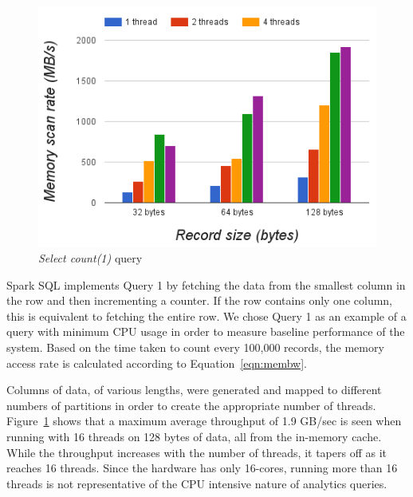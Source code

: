 \documentclass[9pt]{sig-alternate-05-2015}
\begin{document}
\begin{figure}[h]
\centering
\includegraphics[width=\columnwidth]{mem-scan-rates}
\caption{\label{fig:count1}{\it Select count(1)} query}
\end{figure}

Spark SQL implements Query 1 by fetching the data from the smallest column in
the row and then incrementing a counter. If the row contains only one column,
this is equivalent to fetching the entire row. We chose Query 1 as an example
of a query with minimum CPU usage in order to measure baseline performance of
the system.  Based on the time taken to count every 100,000 records, the memory
access rate is calculated according to Equation~\ref{eqn:membw}.

Columns of data, of various lengths, were generated and mapped to different
numbers of partitions in order to create the appropriate number of threads.
Figure~\ref{fig:count1} shows that a maximum average throughput of 1.9 GB/sec
is seen when running with 16 threads on 128 bytes of data, all from the
in-memory cache. While the throughput increases with the number of threads, it
tapers off as it reaches 16 threads. Since the hardware has only 16-cores,
running more than 16 threads is not representative of the CPU intensive nature
of analytics queries.
\end{document}
